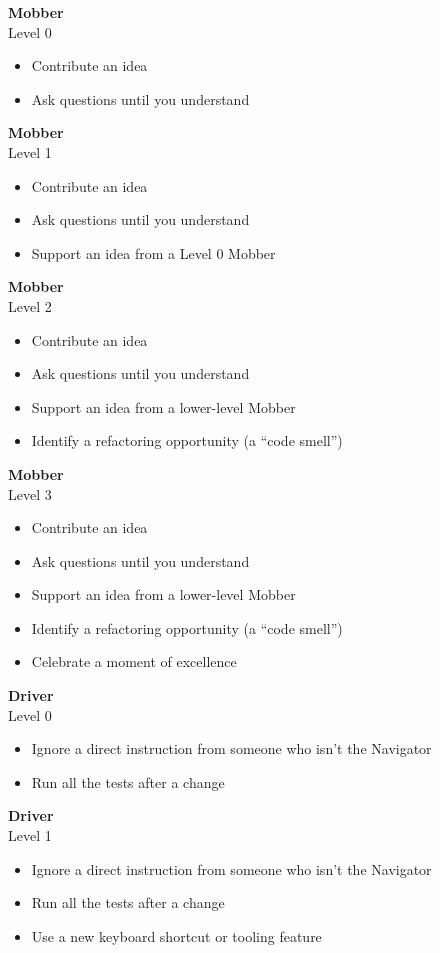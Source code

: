 \documentclass[20pt]{extarticle}
\begin{document}
\newenvironment{role}[2]
{
\begin{centering}
  \textbf{\large{#1}}\\
  Level #2\\
\end{centering}
\begin{itemize}
}
{
\end{itemize}
\pagebreak
}

\begin{role}{Mobber}{0}
  \item Contribute an idea
  \item Ask questions until you understand
\end{role}

\begin{role}{Mobber}{1}
  \item Contribute an idea
  \item Ask questions until you understand
  \item Support an idea from a Level 0 Mobber
\end{role}

\begin{role}{Mobber}{2}
  \item Contribute an idea
  \item Ask questions until you understand
  \item Support an idea from a lower-level Mobber
  \item Identify a refactoring opportunity (a ``code smell'')
\end{role}

\begin{role}{Mobber}{3}
  \item Contribute an idea
  \item Ask questions until you understand
  \item Support an idea from a lower-level Mobber
  \item Identify a refactoring opportunity (a ``code smell'')
  \item Celebrate a moment of excellence
\end{role}



\begin{role}{Driver}{0}
  \item Ignore a direct instruction from someone who isn't the Navigator
  \item Run all the tests after a change
\end{role}

\begin{role}{Driver}{1}
  \item Ignore a direct instruction from someone who isn't the Navigator
  \item Run all the tests after a change
  \item Use a new keyboard shortcut or tooling feature
\end{role}
\end{document}
